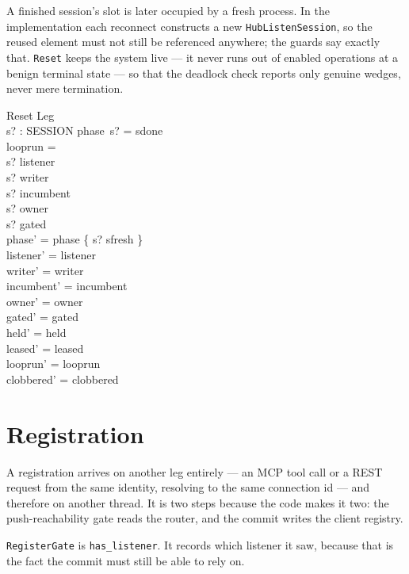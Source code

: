 \documentclass[a4paper,10pt,fleqn]{article}
\begin{document}
A finished session's slot is later occupied by a fresh process.  In the
implementation each reconnect constructs a new \texttt{HubListenSession},
so the reused element must not still be referenced anywhere; the guards
say exactly that.  \texttt{Reset} keeps the system live --- it never runs
out of enabled operations at a benign terminal state --- so that the
deadlock check reports only genuine wedges, never mere termination.

\begin{schema}{Reset}
  \Delta Leg \\
  s? : SESSION
\where
  phase~s? = sdone \\
  looprun = \emptyset \\
  s? \notin listener \\
  s? \notin writer \\
  s? \notin incumbent \\
  s? \notin \ran owner \\
  s? \notin \ran gated \\
  phase' = phase \oplus \{ s? \mapsto sfresh \} \\
  listener' = listener \\
  writer' = writer \\
  incumbent' = incumbent \\
  owner' = owner \\
  gated' = gated \\
  held' = held \\
  leased' = leased \\
  looprun' = looprun \\
  clobbered' = clobbered
\end{schema}

\section{Registration}

A registration arrives on another leg entirely --- an MCP tool call or a
REST request from the same identity, resolving to the same connection id
--- and therefore on another thread.  It is two steps because the code
makes it two: the push-reachability gate reads the router, and the
commit writes the client registry.

\texttt{RegisterGate} is \texttt{has\_listener}.  It records which
listener it saw, because that is the fact the commit must still be able
to rely on.
\end{document}
